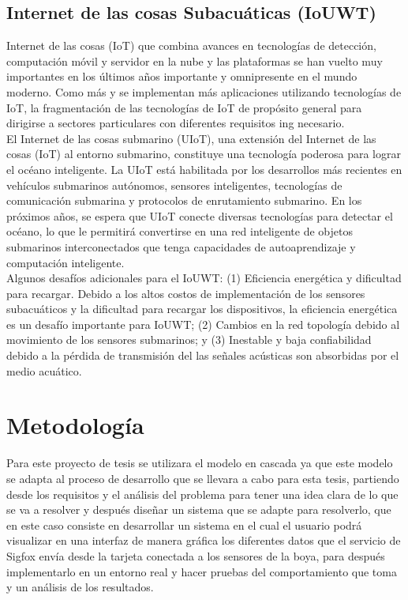 \documentclass[12pt]{book}
\begin{document}
\section{Internet de las cosas Subacuáticas (IoUWT)}
Internet de las cosas (IoT) que combina avances en
tecnologías de detección, computación móvil y servidor en la nube
y las plataformas se han vuelto muy importantes en los últimos años
importante y omnipresente en el mundo moderno. Como más
y se implementan más aplicaciones utilizando tecnologías de IoT,
la fragmentación de las tecnologías de IoT de propósito general para
dirigirse a sectores particulares con diferentes requisitos
ing necesario. \cite{IoT} \\
El Internet de las cosas submarino (UIoT), una extensión del Internet de las cosas (IoT) al entorno submarino, constituye una tecnología poderosa para lograr el océano inteligente. La UIoT está habilitada por los desarrollos más recientes en vehículos submarinos autónomos, sensores inteligentes, tecnologías de comunicación submarina y protocolos de enrutamiento submarino. En los próximos años, se espera que UIoT conecte diversas tecnologías para detectar el océano, lo que le permitirá convertirse en una red inteligente de objetos submarinos interconectados que tenga capacidades de autoaprendizaje y computación inteligente. \cite{UIoT}\\
Algunos desafíos adicionales para el IoUWT: (1) Eficiencia energética y dificultad para recargar. Debido a los altos costos de implementación de los sensores subacuáticos y la dificultad para recargar los dispositivos, la eficiencia energética es un desafío importante para IoUWT; (2) Cambios en la red topología debido al movimiento de los sensores submarinos; y (3) Inestable y baja confiabilidad debido a la pérdida de transmisión del
las señales acústicas son absorbidas por el medio acuático. \cite{Desafios}
\chapter{Metodología }

Para este proyecto de tesis se utilizara el modelo en cascada ya que este modelo se adapta al proceso de desarrollo que se llevara a cabo para esta tesis, partiendo desde los requisitos y el análisis del problema para tener una idea clara de lo que se va a resolver y después diseñar un sistema que se adapte para resolverlo, que en este caso consiste en desarrollar un sistema en el cual el usuario podrá visualizar en una interfaz de manera gráfica los diferentes datos que el servicio de Sigfox envía desde la tarjeta conectada a los sensores de la boya, para después implementarlo en un entorno real y hacer pruebas del comportamiento que toma y un análisis de los resultados. 
\end{document}

